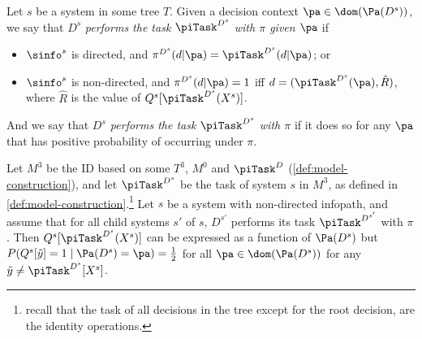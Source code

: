\begin{definition} \label{def:aug23.4-task-performance}
Let $s$ be a system in some tree $T$.
Given a decision context $\pa\in \dom(\Pa(D^s))$, we say that $D^s$ \textit{performs the task $\piTask^{D^s}$ with $\pi$ given $\pa$} if 
\begin{itemize}    
    \item $\sinfo^s$ is directed, and $\pi^{D^s}(d|\pa)=\piTask^{D^s}(d|\pa)$; or
    
    \item $\sinfo^s$ is non-directed, and $\pi^{D^s}(d|\pa)=1$ iff $d=(\piTask^{D^s}(\pa), \hat R)$, where $\hat R$ is the value of $Q^s[\piTask^{D^s}(X^s)]$.
\end{itemize}
And we say that \emph{$D^s$ performs the task $\piTask^{D^s}$ with $\pi$} if it does so for any $\pa$ that has positive probability of occurring under $\pi$. 
\end{definition}


\begin{lemma}\label{le:3.3-model-knowledge-lemma}
Let $M^3$ be the ID based on some $T^3$, $M^0$ and $\piTask^{D}$ (\autoref{def:model-construction}), and let $\piTask^{D^s}$ be the task of system $s$ in $M^3$, as defined in  \autoref{def:model-construction}.\footnote{recall that the task of all decisions in the tree except for the root decision, are the identity operations.}
Let $s$ be a system with non-directed infopath, and assume that for all child systems $s'$ of $s$, $D^{s'}$ performs its task $\piTask^{D^{s'}}$ with $\pi$.
Then $Q^s[\piTask^{D^s}(X^s)]$ can be expressed as a function of $\Pa(D^s)$
but $P(Q^s[\tilde y]=1\mid \Pa(D^s)=\pa)=\frac{1}{2}$ for all $\pa\in \dom (\Pa(D^s))$
for any $\tilde{y} \neq \piTask^{D^s}[X^s]$.
\end{lemma}

